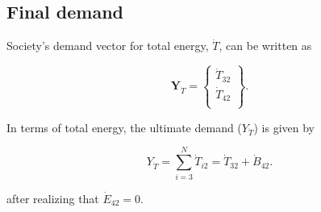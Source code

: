 \documentclass[authoryear,preprint,review,12pt]{elsarticle}
\renewcommand{\vec}[1]{\mathbf{#1}}
\begin{document}
%
%
%
%
%
%
%

\subsection{Final demand}

Society's demand vector for total energy, $\dot{T}$, can be written as 

\begin{equation} \label{eq:demand_vector_T_dot}
	\vec{Y}_{\dot{T}} = 	\begin{Bmatrix} 	\dot{T}_{32}	\\
																\dot{T}_{42}	\\
									\end{Bmatrix}.
\end{equation}

\noindent In terms of total energy, the ultimate demand ($Y_{\dot{T}}$) is given by 

\begin{equation} \label{eq:final_demand_T_sum}
	Y_{\dot{T}} = 	\sum_{i=3}^{N} \dot{T}_{i2} = \dot{T}_{32} + \dot{B}_{42}.
\end{equation}

\noindent after realizing that $\dot{E}_{42} = 0$. 
\end{document}
